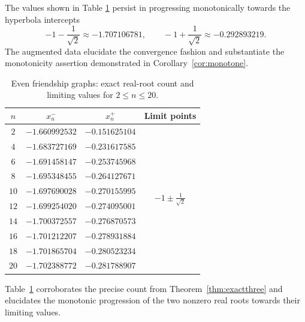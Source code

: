 \documentclass[12pt]{article}
\theoremstyle{definition}
\begin{document}
	
	The values shown in Table \ref{tab:friendshipreal}  persist in progressing monotonically towards the hyperbola intercepts
	$$-1 - \frac{1}{\sqrt{2}} \approx -1.707106781,\qquad
	-1+\frac{1}{\sqrt{2}} \approx -0.292893219.$$ The augmented data elucidate the convergence fashion and substantiate the monotonicity assertion demonstrated in Corollary~\ref{cor:monotone}.
	\begin{table}[H]
		\centering
		\caption{Even friendship graphs: exact real-root count and limiting values for $2\le n\le 20$.}
		\label{tab:friendshipreal}
		\begin{tabular}{cccc}
			\toprule
			$n$ & $x_n^-$ & $x_n^+$ & Limit points \\
			\midrule
			$2$  & $-1.660992532$ & $-0.151625104$ & \multirow{10}{*}{$-1\pm \tfrac{1}{\sqrt2}$} \\
			$4$  & $-1.683727169$ & $-0.231617585$ & \\
			$6$  & $-1.691458147$ & $-0.253745968$ & \\
			$8$  & $-1.695348455$ & $-0.264127671$ & \\
			$10$ & $-1.697690028$ & $-0.270155995$ & \\
			$12$ & $-1.699254020$ & $-0.274095001$ & \\
			$14$ & $-1.700372557$ & $-0.276870573$ & \\
			$16$ & $-1.701212207$ & $-0.278931884$ & \\
			$18$ & $-1.701865704$ & $-0.280523234$ & \\
			$20$ & $-1.702388772$ & $-0.281788907$ & \\
			\bottomrule
		\end{tabular}
	\end{table}
	Table~\ref{tab:friendshipreal} corroborates the precise count from Theorem~\ref{thm:exactthree} and elucidates the monotonic progression of the two nonzero real roots towards their limiting values.
\end{document}
